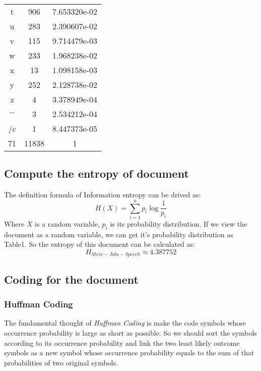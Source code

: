 \documentclass[12pt]{article} %
\numberwithin{equation}{section}
\def\cents{\hbox{\rm\rlap/c}}
\begin{document}
\begin{table}[!hptb]
\begin{minipage}{.5\linewidth}
\begin{tabular}{ccc}
t 		 &906    &7.653320e-02\\
u 		 &283    &2.390607e-02\\
v 		 &115    &9.714479e-03\\
w 		 &233    &1.968238e-02\\
x 		 &13     &1.098158e-03\\
y 		 &252    &2.128738e-02\\
z 		 &4      &3.378949e-04\\
$-$  	 &3      &2.534212e-04\\
\cents   &1      &8.447373e-05\\  \hline
71       &11838  & 1 \\   \hline
\end{tabular}
\end{minipage}
\end{table}


\subsection{Compute the entropy of document}
The definition formula of Information entropy can be drived as:
\begin{equation}\label{ep:eqs}
  H(X) = \sum_{i=1}^{n} p_{i}\log \frac{1}{p_{i}}
\end{equation}
Where $X$ is a random variable, ${p_{i}}$ is its probability distribution.
If we view the document as a random variable, we can get it's probability distribution as Table1. So the entropy of this document can be calculated as:
\begin{equation}\label{ep:eqs}
    H_{Steve-Jobs-Speech} \approx 4.387752
\end{equation}

\vspace{3\baselineskip}

\subsection{Coding for the document}

\subsubsection{Huffman Coding}

The fundamental thought of \emph{Huffman Coding} is make the code symbols whose occurrence probability is large as short as possible. So we should sort the symbols according to its occurrence probability and link the two least likely outcome symbols as a new symbol whose occurrence probability equals to the sum of that probabilities of two original symbols.
\end{document}
